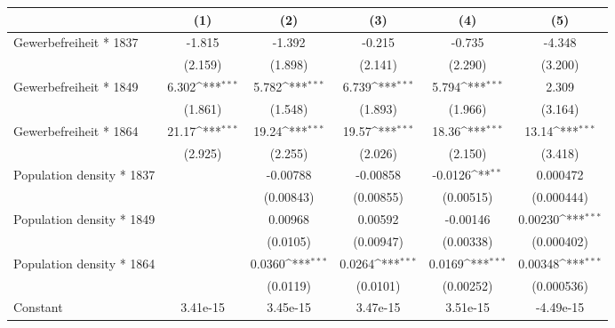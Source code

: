 {
\def\sym#1{\ifmmode^{#1}\else\(^{#1}\)\fi}
\begin{tabular}{l*{5}{c}}
\hline\hline
                    &\multicolumn{1}{c}{(1)}         &\multicolumn{1}{c}{(2)}         &\multicolumn{1}{c}{(3)}         &\multicolumn{1}{c}{(4)}         &\multicolumn{1}{c}{(5)}         \\
\hline
Gewerbefreiheit * 1837&      -1.815         &      -1.392         &      -0.215         &      -0.735         &      -4.348         \\
                    &     (2.159)         &     (1.898)         &     (2.141)         &     (2.290)         &     (3.200)         \\
[1em]
Gewerbefreiheit * 1849&       6.302\sym{***}&       5.782\sym{***}&       6.739\sym{***}&       5.794\sym{***}&       2.309         \\
                    &     (1.861)         &     (1.548)         &     (1.893)         &     (1.966)         &     (3.164)         \\
[1em]
Gewerbefreiheit * 1864&       21.17\sym{***}&       19.24\sym{***}&       19.57\sym{***}&       18.36\sym{***}&       13.14\sym{***}\\
                    &     (2.925)         &     (2.255)         &     (2.026)         &     (2.150)         &     (3.418)         \\
[1em]
Population density * 1837&                     &    -0.00788         &    -0.00858         &     -0.0126\sym{**} &    0.000472         \\
                    &                     &   (0.00843)         &   (0.00855)         &   (0.00515)         &  (0.000444)         \\
[1em]
Population density * 1849&                     &     0.00968         &     0.00592         &    -0.00146         &     0.00230\sym{***}\\
                    &                     &    (0.0105)         &   (0.00947)         &   (0.00338)         &  (0.000402)         \\
[1em]
Population density * 1864&                     &      0.0360\sym{***}&      0.0264\sym{***}&      0.0169\sym{***}&     0.00348\sym{***}\\
                    &                     &    (0.0119)         &    (0.0101)         &   (0.00252)         &  (0.000536)         \\
[1em]
Constant            &    3.41e-15         &    3.45e-15         &    3.47e-15         &    3.51e-15         &   -4.49e-15         \\

\end{tabular}}
